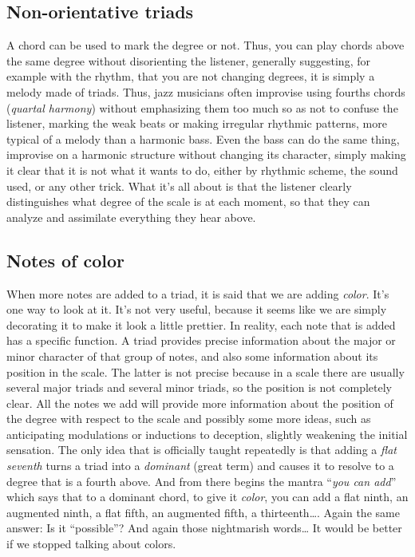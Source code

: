 \documentclass[]{report}
\begin{document}
\subsection{Non-orientative triads}
A chord can be used to mark the degree or not. Thus, you can play chords above the same degree without disorienting the listener, generally suggesting, for example with the rhythm, that you are not changing degrees, it is simply a melody made of triads. Thus, jazz musicians often improvise using fourths chords (\emph{quartal harmony}) without emphasizing them too much so as not to confuse the listener, marking the weak beats or making irregular rhythmic patterns, more typical of a melody than a harmonic bass. Even the bass can do the same thing, improvise on a harmonic structure without changing its character, simply making it clear that it is not what it wants to do, either by rhythmic scheme, the sound used, or any other trick. What it's all about is that the listener clearly distinguishes what degree of the scale is at each moment, so that they can analyze and assimilate everything they hear above.
\subsection{Notes of color}
When more notes are added to a triad, it is said that we are adding \emph{color}. It's one way to look at it. It's not very useful, because it seems like we are simply decorating it to make it look a little prettier.
In reality, each note that is added has a specific function. A triad provides precise information about the major or minor character of that group of notes, and also some information about its position in the scale. The latter is not precise because in a scale there are usually several major triads and several minor triads, so the position is not completely clear. All the notes we add will provide more information about the position of the degree with respect to the scale and possibly some more ideas, such as anticipating modulations or inductions to deception, slightly weakening the initial sensation.
The only idea that is officially taught repeatedly is that adding a \emph{flat seventh} turns a triad into a \emph{dominant} (great term) and causes it to resolve to a degree that is a fourth above. And from there begins the mantra ``\emph{you can add}'' which says that to a dominant chord, to give it \emph{color}, you can add a flat ninth, an augmented ninth, a flat fifth, an augmented fifth, a thirteenth\ldots.
Again the same answer: Is it ``possible''? And again those nightmarish words\ldots{}
It would be better if we stopped talking about colors.
\end{document}
